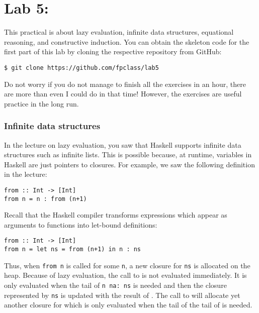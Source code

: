 \section{Lab 5: \practicalFiveTitle}

This practical is about lazy evaluation, infinite data structures, equational reasoning, and constructive induction. You can obtain the skeleton code for the first part of this lab by cloning the respective repository from GitHub:
\begin{verbatim}
$ git clone https://github.com/fpclass/lab5
\end{verbatim}
Do not worry if you do not manage to finish all the exercises in an hour, there are more than even I could do in that time! However, the exercises are useful practice in the long run.

\subsubsection{Infinite data structures}

In the lecture on lazy evaluation, you saw that Haskell supports infinite data structures such as infinite lists. This is possible because, at runtime, variables in Haskell are just pointers to closures. For example, we saw the following definition in the lecture:
\begin{verbatim}
from :: Int -> [Int]
from n = n : from (n+1)
\end{verbatim}
Recall that the Haskell compiler transforms expressions which appear as arguments to functions into let-bound definitions:
\begin{verbatim}
from :: Int -> [Int]
from n = let ns = from (n+1) in n : ns
\end{verbatim}
Thus, when \texttt{\small from n} is called for some \texttt{\small n}, a new closure for \texttt{\small ns} is allocated on the heap. Because of lazy evaluation, the call to  is not evaluated immediately. It is only evaluated when the tail of \texttt{\small n~na:~ns} is needed and then the closure represented by \texttt{\small ns} is updated with the result of . The call to  will allocate yet another closure for  which is only evaluated when the tail of the tail of  is needed.

\taskLine 

